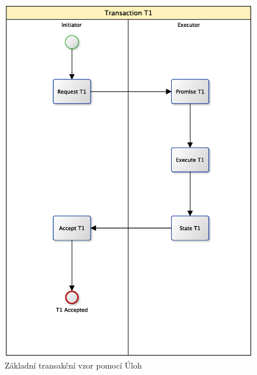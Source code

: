 \documentclass[]{article}
\begin{document}
\begin{figure}[H]\centering
\includegraphics[width=1.0\textwidth]{obrazky/transaction-basic-tasks}
\caption{Základní transakční vzor pomocí Úloh}
\label{fig:Zk_trans_ulohy}
\end{figure}
\end{document}
